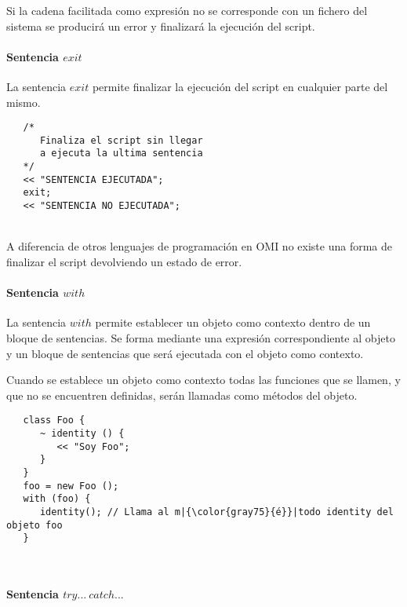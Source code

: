 Si la cadena facilitada como expresión no se corresponde con un fichero del sistema
se producirá un error y finalizará la ejecución del script.

\paragraph{Sentencia $exit$} \label{sec:stmt_exit}

La sentencia $exit$ permite finalizar la ejecución del script en cualquier parte del mismo. \\

\begin{lstlisting}
   /*
      Finaliza el script sin llegar 
      a ejecuta la ultima sentencia
   */
   << "SENTENCIA EJECUTADA";
   exit;
   << "SENTENCIA NO EJECUTADA";
\end{lstlisting}
\hfill\\

A diferencia de otros lenguajes de programación en OMI no existe una forma de finalizar el script 
devolviendo un estado de error.

\paragraph{Sentencia $with$} \label{sec:stmt_with}

La sentencia $with$ permite establecer un objeto como contexto dentro de un bloque de sentencias. Se forma mediante
una expresión correspondiente al objeto y un bloque de sentencias que será ejecutada con el objeto como contexto. 

Cuando se establece un objeto como contexto todas las funciones que se llamen, y que no se encuentren definidas, serán 
llamadas como métodos del objeto. \\

\begin{lstlisting}
   class Foo {
      ~ identity () {
         << "Soy Foo";
      } 
   }
   foo = new Foo ();
   with (foo) {
      identity(); // Llama al m|{\color{gray75}{é}}|todo identity del objeto foo
   }
\end{lstlisting}
\hfill\\

\paragraph{Sentencia $try...\ catch...$} \label{sec:stmt_try}

